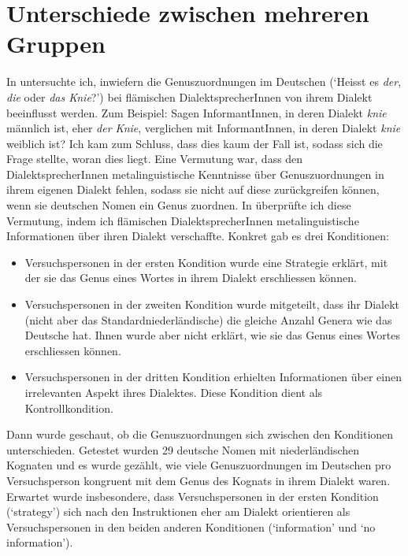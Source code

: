 \documentclass[oneside, 10pt]{book}\usepackage[]{graphicx}\usepackage[]{xcolor}
\begin{document}
\section{Unterschiede zwischen mehreren Gruppen}\label{sec:unterschiede_mehrere_gruppen}
In \citet{Vanhove2017} untersuchte ich, inwiefern die Genuszuordnungen
im Deutschen (`Heisst es \textit{der}, \textit{die} oder \textit{das Knie}?')
bei flämischen
DialektsprecherInnen von ihrem Dialekt beeinflusst werden.
Zum Beispiel: Sagen InformantInnen, in deren Dialekt \textit{knie} männlich ist,
eher \textit{der Knie}, verglichen mit InformantInnen, in deren
Dialekt \textit{knie} weiblich ist?
Ich kam zum Schluss, dass dies kaum der Fall ist, sodass sich
die Frage stellte, woran dies liegt. Eine Vermutung war, dass
den DialektsprecherInnen metalinguistische Kenntnisse über
Genuszuordnungen in ihrem eigenen Dialekt fehlen, sodass sie
nicht auf diese zurückgreifen können, wenn sie deutschen Nomen
ein Genus zuordnen. In \citet{Vanhove2018} überprüfte ich diese
Vermutung, indem ich flämischen DialektsprecherInnen metalinguistische
Informationen über ihren Dialekt verschaffte. Konkret gab es
drei Konditionen:
\begin{itemize}
 \item Versuchspersonen in der ersten Kondition wurde eine Strategie
 erklärt, mit der sie das Genus eines Wortes in ihrem Dialekt erschliessen
 können.

 \item Versuchspersonen in der zweiten Kondition wurde mitgeteilt,
 dass ihr Dialekt (nicht aber das Standardniederländische) die gleiche
 Anzahl Genera wie das Deutsche hat. Ihnen wurde aber nicht erklärt,
 wie sie das Genus eines Wortes erschliessen können.

 \item Versuchspersonen in der dritten Kondition erhielten Informationen
 über einen irrelevanten Aspekt ihres Dialektes. Diese Kondition dient
 als Kontrollkondition.
\end{itemize}

Dann wurde geschaut, ob die Genuszuordnungen sich zwischen den Konditionen
unterschieden. Getestet wurden 29 deutsche Nomen mit niederländischen
Kognaten und es wurde gezählt, wie viele Genuszuordnungen im Deutschen
pro Versuchsperson kongruent mit dem Genus des Kognats in
ihrem Dialekt waren.
Erwartet wurde insbesondere, dass Versuchspersonen in der
ersten Kondition (`strategy') sich nach den Instruktionen eher
am Dialekt orientieren als Versuchspersonen in den beiden anderen Konditionen
(`information' und `no information').
\end{document}
